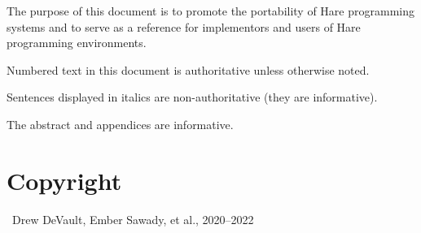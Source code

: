 
\specitem
The purpose of this document is to promote the portability of Hare programming
systems and to serve as a reference for implementors and users of Hare
programming environments.

\specitem
Numbered text in this document is authoritative unless otherwise noted.

\specitem
Sentences displayed in italics are non-authoritative (they are informative).


\specitem
The abstract and appendices are informative.

\section{Copyright}

\textcopyright\ Drew DeVault, Ember Sawady, et al., 2020--2022

